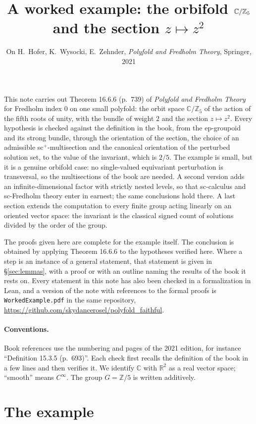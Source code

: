 \documentclass[11pt,a4paper]{article}
\title{A worked example: the orbifold $\C/\Z_5$ and the section $z\mapsto z^2$}
\author{}
\date{On H.~Hofer, K.~Wysocki, E.~Zehnder, \emph{Polyfold and Fredholm Theory}, Springer, 2021}
\theoremstyle{plain}
\theoremstyle{definition}
\theoremstyle{remark}
\newcommand{\C}{\mathbb{C}}
\newcommand{\R}{\mathbb{R}}
\newcommand{\Z}{\mathbb{Z}}
\newcommand{\ZZ}{\Z/5}
\begin{document}
\maketitle

\noindent
This note carries out Theorem 16.6.6 (p.~739) of \emph{Polyfold and Fredholm Theory} for Fredholm
index $0$ on one small polyfold: the orbit space $\C/\Z_5$ of the action of the fifth roots of unity,
with the bundle of weight $2$ and the section $z\mapsto z^2$. Every hypothesis is checked against the
definition in the book, from the ep-groupoid and its strong bundle, through the orientation of the
section, the choice of an admissible sc$^+$-multisection and the canonical orientation of the perturbed
solution set, to the value of the invariant, which is $2/5$. The example is small, but it is a genuine
orbifold case: no single-valued equivariant perturbation is transversal, so the multisections of the
book are needed. A second version adds an infinite-dimensional factor with strictly nested levels, so
that sc-calculus and sc-Fredholm theory enter in earnest; the same conclusions hold there. A last
section extends the computation to every finite group acting linearly on an oriented vector space: the
invariant is the classical signed count of solutions divided by the order of the group.

The proofs given here are complete for the example itself. The conclusion is obtained by applying
Theorem 16.6.6 to the hypotheses verified here. Where a step is an instance of a general statement, that
statement is given in \S\ref{sec:lemmas}, with a proof or with an outline naming the results of the book
it rests on. Every statement in this note has also been checked in a formalization in Lean, and a version
of the note with references to the formal proofs is \texttt{WorkedExample.pdf} in the same repository,
\url{https://github.com/skydancerosel/polyfold_faithful}.

\paragraph{Conventions.} Book references use the numbering and pages of the 2021 edition, for instance
``Definition 15.3.5 (p.~693)''. Each check first recalls the definition of the book in a few lines and
then verifies it. We identify $\C$ with $\R^2$ as a real vector space; ``smooth'' means $C^\infty$. The
group $G=\ZZ$ is written additively.

\section{The example}\label{sec:example}
\end{document}
